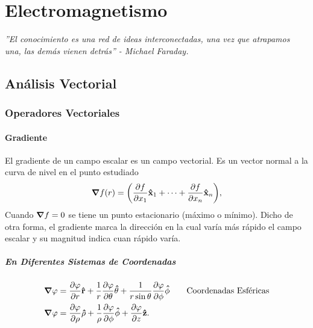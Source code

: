 
\part{Electromagnetismo}

\vspace*{\fill}

\begin{center}
	\textit{''El conocimiento es una red de ideas interconectadas, una vez que atrapamos una, las demás vienen detrás'' - Michael Faraday.}
\end{center}

\vspace*{\fill}

\chapter{Análisis Vectorial}
\section{Operadores Vectoriales}
\subsection{Gradiente}
El gradiente de un campo escalar es un campo vectorial. Es un vector normal a la curva de nivel en el punto estudiado
\begin{equation}
	\grad{f(r)} = \qty(\pdv{f}{x_1} \vu{x}_1 + \cdots + \pdv{f}{x_n} \vu{x}_n),
\end{equation}
Cuando $\grad{f} = 0$ se tiene un punto estacionario (máximo o mínimo). Dicho de otra forma, el gradiente marca la dirección en la cual varía más rápido el campo escalar y su magnitud indica cuan rápido varía. \\
\subsubsection{En Diferentes Sistemas de Coordenadas}
\begin{align*}
	\grad{\varphi} &= \pdv{\varphi}{r} \vu{r} + \frac{1}{r} \pdv{\varphi}{\theta} \vu{\theta} + \frac{1}{r\sin{\theta}} \pdv{\varphi}{\phi} \vu{\phi} \qquad \text{Coordenadas Esféricas} \\
	\grad{\varphi} &= \pdv{\varphi}{\rho} \vu{\rho} + \frac{1}{\rho} \pdv{\varphi}{\phi} \vu{\phi} + \pdv{\varphi}{z} \vu{z}.
\end{align*}
 



